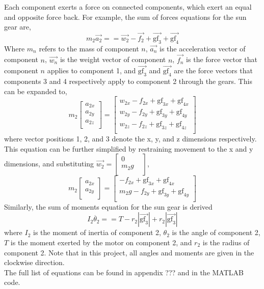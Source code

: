 Each component exerts a force on connected components, which exert an equal and opposite force back.
For example, the sum of forces equations for the sun gear are,\\
\begin{equation}
	m_2\vec{a_2} == \vec{w_2}-\vec{f_2}+\vec{\mathrm{gf}_3}+\vec{\mathrm{gf}_4}
\end{equation}
Where $m_n$ refers to the mass of component $n$, $\vec{a_n}$ is the acceleration vector of component $n$, $\vec{w_n}$ is the weight vector of component $n$, $\vec{f_n}$ is the force vector that component $n$ applies to component 1,  and $\vec{\mathrm{gf}_3}$ and $\vec{\mathrm{gf}_4}$ are the force vectors that components 3 and 4 respectively apply to component 2 through the gears.
This can be expanded to,
\begin{equation}
	m_2
	\begin{bmatrix}
		a_{2x}\\
		a_{2y}\\
		a_{2z}\\
	\end{bmatrix}
	=
	\begin{bmatrix}
		w_{2x}-f_{2x}+\mathrm{gf}_{3x}+\mathrm{gf}_{4x}\\
		w_{2y}-f_{2y}+\mathrm{gf}_{3y}+\mathrm{gf}_{4y}\\
		w_{2z}-f_{2z}+\mathrm{gf}_{3z}+\mathrm{gf}_{4z}\\
	\end{bmatrix}
\end{equation}
where vector positions 1, 2, and 3 denote the x, y, and z dimensions respectively. This equation can be further simplified by restraining movement to the x and y dimensions, and substituting $\vec{w_2} = \begin{bmatrix} 0 \\ m_2g & \\ \end{bmatrix}$,
\begin{equation}
	m_2
	\begin{bmatrix}
		a_{2x}\\
		a_{2y}\\
	\end{bmatrix}
	=
	\begin{bmatrix}
		-f_{2x}+\mathrm{gf}_{3x}+\mathrm{gf}_{4x}\\
		m_2g-f_{2y}+\mathrm{gf}_{3y}+\mathrm{gf}_{4y}\\
	\end{bmatrix}
\end{equation}
Similarly, the sum of moments equation for the sun gear is derived
\begin{equation}
	I_2\ddot{\theta_2} == T - r_2|\vec{\mathrm{gf}_3}| + r_2|\vec{\mathrm{gf}_3}|
\end{equation}
where $I_2$ is the moment of inertia of component 2, $\theta_2$ is the angle of component 2, $T$ is the moment exerted by the motor on component 2, and $r_2$ is the radius of component 2. Note that in this project, all angles and moments are given in the clockwise direction.
\\
The full list of equations can be found in appendix ??? and in the MATLAB code.



